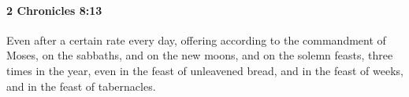 
		\paragraph{2 Chronicles 8:13} %
			\label{2CHRONICLES-8-13}

			Even after a certain rate every day, offering according to the commandment of Moses, on the sabbaths, and on the new moons, and on the solemn feasts, three times in the year, even in the feast of unleavened bread, and in the feast of weeks, and in the feast of tabernacles.


